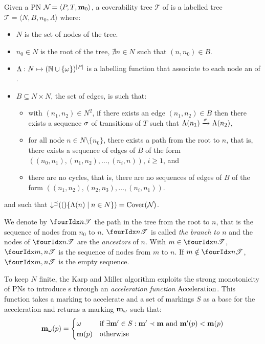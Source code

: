 \begin{defi}
  Given a \ac{PN} $\mathcal{N}_{} = \langle P,T, \mathbf{m}_0\rangle$, a coverability tree $\mathcal{T}$ of \namePN is a labelled tree $\mathcal{T} = \langle N, B, n_0, \Lambda\rangle$ where:
  \begin{itemize}
    \item $N$ is the set of nodes of the tree.%
    \item $n_0 \in N$ is the root of the tree,  $\nexists n \in N$ such that $(n, n_0) \in B$.
    \item $\Lambda : N \mapsto (\mathbb{N} \cup \{\omega\})^{\left|P\right|}$ is a labelling function that associate to each node an \omark of \namePN.
    \item $B \subseteq N \times N$, the set of edges, is such that:
      \begin{itemize}
        \item with $(n_1, n_2) \in N^2$, if there exists an edge $(n_1, n_2) \in B$ then there exists a sequence $\seqt$ of transitions of $T$ such that $\Lambda(n_1) \fire{\seqt} \Lambda(n_2)$,
        \item for all node $n \in N \setminus \{n_0\}$, there exists a path from the root to $n$, that is, there exists a sequence of edges of $B$ of the form $((n_0, n_1), (n_1, n_2), \dots, (n_{i}, n))$, $i \geq 1$, and
        \item there are no cycles, that is, there are no sequences of edges of $B$ of the form $((n_1, n_2), (n_2, n_3), \dots, (n_i, n_1))$.
      \end{itemize}
  \end{itemize}
  and such that $\operatorname{\downarrow^\preceq}(()\{\Lambda(n) \mid n \in N\}) = \operatorname{Cover}(\mathcal{N}_{})$.
\end{defi}

We denote by $\treepath{n}$ the path in the tree from the root to $n$, that is the sequence of nodes from $n_0$ to $n$.
$\treepath{n}$ is called \emph{the branch to $n$} and the nodes of $\treepath{n}$ are the \emph{ancestors} of $n$.
With $m \in \treepath{n}$, $\treepath{m,n}$ is the sequence of nodes from $m$ to $n$.
If $m \notin \treepath{n}$, $\treepath{m,n}$ is the empty sequence.

To keep $N$ finite, the Karp and Miller algorithm exploits the strong monotonicity of \acp{PN} to introduce \omark{}s through an \emph{acceleration function} $\operatorname{Acceleration}$.
This function takes a marking \mar to accelerate and a set of markings $S$ as a base for the acceleration and returns a marking $\mathbf{m}_\omega$ such that:
\[
  \mathbf{m}_\omega(p) =
  \begin{cases}
    \omega    &\text{if } \exists \mathbf{m}' \in S : \mathbf{m}' \prec \mathbf{m} \text{ and } \mathbf{m}'(p) < \mathbf{m}(p) \\
    \mathbf{m}(p)  &\text{otherwise}
  \end{cases}
\]

